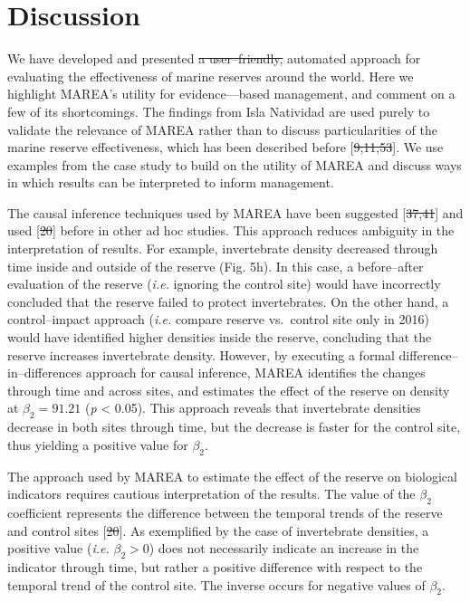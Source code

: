 \documentclass[12pt,]{article}
\providecommand{\DIFaddtex}[1]{{\protect\color{blue}\uwave{#1}}} %
\providecommand{\DIFdeltex}[1]{{\protect\color{red}\sout{#1}}}                      %
\providecommand{\DIFaddbegin}{} %
\providecommand{\DIFaddend}{} %
\providecommand{\DIFdelbegin}{} %
\providecommand{\DIFdelend}{} %
\providecommand{\DIFadd}[1]{\texorpdfstring{\DIFaddtex{#1}}{#1}} %
\providecommand{\DIFdel}[1]{\texorpdfstring{\DIFdeltex{#1}}{}} %
\newcommand{\DIFscaledelfig}{0.5}
\newlength{\DIFdelgraphicswidth} %
\newlength{\DIFdelgraphicsheight} %
\newcommand{\DIFaddincludegraphics}[2][]{{\color{blue}\fbox{\DIFOincludegraphics[#1]{#2}}}} %
\newcommand{\DIFdelincludegraphics}[2][]{%
\sbox{\DIFdelgraphicsbox}{\DIFOincludegraphics[#1]{#2}}%
\settoboxwidth{\DIFdelgraphicswidth}{\DIFdelgraphicsbox} %
\settoboxtotalheight{\DIFdelgraphicsheight}{\DIFdelgraphicsbox} %
\scalebox{\DIFscaledelfig}{%
\parbox[b]{\DIFdelgraphicswidth}{\usebox{\DIFdelgraphicsbox}\\[-\baselineskip] \rule{\DIFdelgraphicswidth}{0em}}\llap{\resizebox{\DIFdelgraphicswidth}{\DIFdelgraphicsheight}{%
\setlength{\unitlength}{\DIFdelgraphicswidth}%
\begin{picture}(1,1)%
\thicklines\linethickness{2pt} %
{\color[rgb]{1,0,0}\put(0,0){\framebox(1,1){}}}%
{\color[rgb]{1,0,0}\put(0,0){\line( 1,1){1}}}%
{\color[rgb]{1,0,0}\put(0,1){\line(1,-1){1}}}%
\end{picture}%
}\hspace*{3pt}}} %
} %
\DeclareRobustCommand{\DIFaddbegin}{\DIFOaddbegin \let\includegraphics\DIFaddincludegraphics} %
\DeclareRobustCommand{\DIFaddend}{\DIFOaddend \let\includegraphics\DIFOincludegraphics} %
\DeclareRobustCommand{\DIFdelbegin}{\DIFOdelbegin \let\includegraphics\DIFdelincludegraphics} %
\DeclareRobustCommand{\DIFdelend}{\DIFOaddend \let\includegraphics\DIFOincludegraphics} %
\begin{document}
\clearpage

\section{Discussion}\label{discussion}

We have developed and presented \DIFdelbegin \DIFdel{a user--friendly, }\DIFdelend \DIFaddbegin \DIFadd{an }\DIFaddend automated approach for evaluating the
effectiveness of marine reserves \DIFaddbegin \DIFadd{in Mexico, and perhaps }\DIFaddend around the
world. Here we highlight MAREA's utility for evidence---based
management, and comment on a few of its shortcomings. The findings from
Isla Natividad are used purely to validate the relevance of MAREA rather
than to discuss particularities of the marine reserve effectiveness,
which has been described before {[}\DIFdelbegin \DIFdel{9,11,53}\DIFdelend \DIFaddbegin \DIFadd{8,10,43}\DIFaddend {]}. We use examples from the
case study to build on the utility of MAREA and discuss ways in which
results can be interpreted to inform management.

The causal inference techniques used by MAREA have been suggested
{[}\DIFdelbegin \DIFdel{37,41}\DIFdelend \DIFaddbegin \DIFadd{38,47}\DIFaddend {]} and used {[}\DIFdelbegin \DIFdel{20}\DIFdelend \DIFaddbegin \DIFadd{21}\DIFaddend {]} before in other ad hoc studies. This
approach reduces ambiguity in the interpretation of results. For
example, invertebrate density decreased through time inside and outside
of the reserve (Fig. 5h). In this case, a before--after evaluation of
the reserve (\emph{i.e.} ignoring the control site) would have
incorrectly concluded that the reserve failed to protect invertebrates.
On the other hand, a control--impact approach (\emph{i.e.} compare
reserve vs.~control site only in 2016) would have identified higher
densities inside the reserve, concluding that the reserve increases
invertebrate density. However, by executing a formal
difference--in--differences approach for causal inference, MAREA
identifies the changes through time and across sites, and estimates the
effect of the reserve on density at \(\beta_2 = 91.21\) (\emph{p}
\textless{} 0.05). This approach reveals that invertebrate densities
decrease in both sites through time, but the decrease is faster for the
control site, thus yielding a positive value for \(\beta_2\).

The approach used by MAREA to estimate the effect of the reserve on
biological indicators requires cautious interpretation of the results.
The value of the \(\beta_2\) coefficient represents the difference
between the temporal trends of the reserve and control sites {[}\DIFdelbegin \DIFdel{20}\DIFdelend \DIFaddbegin \DIFadd{21}\DIFaddend {]}.
As exemplified by the case of invertebrate densities, a positive value
(\emph{i.e.} \(\beta_2 > 0\)) does not necessarily indicate an increase
in the indicator through time, but rather a positive difference with
respect to the temporal trend of the control site. The inverse occurs
for negative values of \(\beta_2\).
\end{document}
